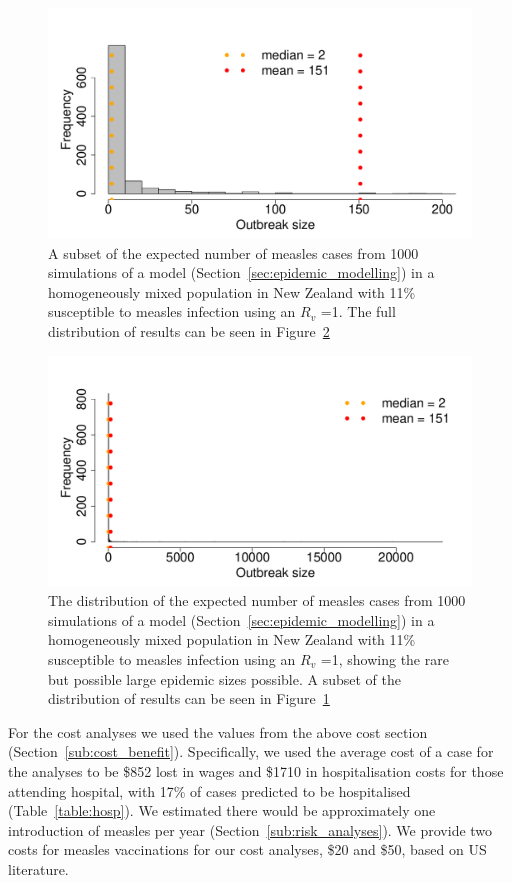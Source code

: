 \documentclass{article}
\begin{document}
\begin{figure}
     \centering
\includegraphics{draftfinalreport-055}
     \caption{A subset of the expected number of measles cases from 1000 simulations of a model (Section~\ref{sec:epidemic_modelling}) in a homogeneously mixed population in New Zealand with 11\% susceptible to measles infection using an $R_v$ =1. The full distribution of results can be seen in Figure~\ref{fig:sim1}}
     \label{fig:sim}
\end{figure}

\begin{figure}
     \centering
\includegraphics{draftfinalreport-056}
     \caption{The distribution of the expected number of measles cases from 1000 simulations of a model (Section~\ref{sec:epidemic_modelling}) in a homogeneously mixed population in New Zealand with 11\% susceptible to measles infection using an $R_v$ =1, showing the rare but possible large epidemic sizes possible. A subset of the distribution of results can be seen in Figure~\ref{fig:sim}}
     \label{fig:sim1}
\end{figure}

For the cost analyses we used the values from the above cost section (Section~\ref{sub:cost_benefit}). Specifically, we used the average cost of a case for the analyses to be \$852 lost in wages and \$1710 in hospitalisation costs for those attending hospital, with 17\% of cases predicted to be hospitalised (Table~\ref{table:hosp}). We estimated there would be approximately one introduction of measles per year (Section~\ref{sub:risk_analyses}). We provide two costs for measles vaccinations for our cost analyses, \$20 and \$50, based on US literature.
\end{document}
